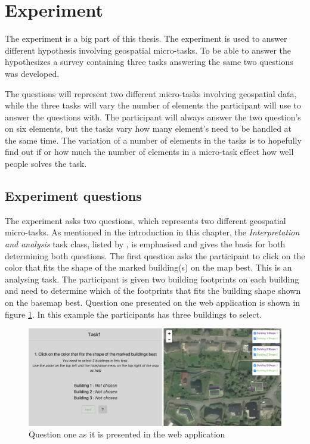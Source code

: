 \section{Experiment}\label{sec:survey}
The experiment is a big part of this thesis. The experiment is used to answer different hypothesis involving geospatial micro-tasks. To be able to answer the hypothesizes a survey containing three tasks answering the same two questions was developed. 

The questions will represent two different micro-tasks involving geospatial data, while the three tasks will vary the number of elements the participant will use to answer the questions with. The participant will always answer the two question's on six elements, but the tasks vary how many element's need to be handled at the same time. The variation of a number of elements in the tasks is to hopefully find out if or how much the number of elements in a micro-task effect how well people solves the task. 

\subsection{Experiment questions}
The experiment asks two questions, which represents two different geospatial micro-tasks. As mentioned in the introduction in this chapter, the \textit{Interpretation and analysis} task class, listed by \cite{Gadiraju2015}, is emphasised and gives the basis for both determining both questions.  The first question asks the participant to click on the color that fits the shape of the marked building(s) on the map best. This is an analysing task. The participant is given two building footprints on each building and need to determine which of the footprints that fits the building shape shown on the basemap best. Question one presented on the web application is shown in figure \ref{fig:q12}. In this example the participants has three buildings to select. 

\begin{figure}[h]
	\centering
	\includegraphics[width=0.8\linewidth]{fig/q1_2}
	\caption{Question one as it is presented in the web application}
	\label{fig:q12}
\end{figure}


